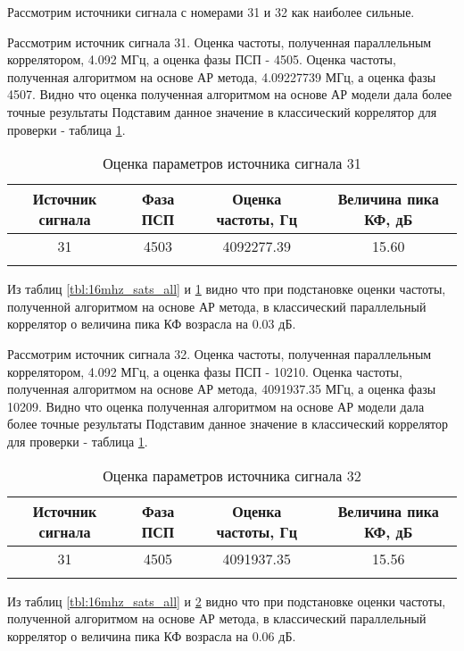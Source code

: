 Рассмотрим источники сигнала с номерами 31 и 32 как наиболее сильные.

Рассмотрим источник сигнала 31. Оценка частоты, полученная параллельным коррелятором, 4.092 МГц, а оценка фазы ПСП - 4505.
Оценка частоты, полученная алгоритмом на основе АР метода, 4.09227739 МГц, а оценка фазы 4507. Видно что оценка полученная алгоритмом на основе АР
модели дала более точные результаты Подставим данное значение в классический коррелятор для проверки - таблица \ref{tbl:16mhz_sat_31}.
\begin{center}
	\begin{longtable}{ | c | c | c | c |}
	\hline
	Источник сигнала & Фаза ПСП & Оценка частоты, Гц & Величина пика КФ, дБ \\ \hline
	31 & 4503 & 4092277.39	& 15.60 \\ \hline
	\caption{Оценка параметров источника сигнала 31}
	\label{tbl:16mhz_sat_31}
	\end{longtable}
\end{center}

Из таблиц \ref{tbl:16mhz_sats_all} и \ref{tbl:16mhz_sat_31} видно что при подстановке оценки частоты, полученной алгоритмом на основе АР метода, в
классический параллельный коррелятор о величина пика КФ возрасла на 0.03 дБ.

Рассмотрим источник сигнала 32. Оценка частоты, полученная параллельным коррелятором, 4.092 МГц, а оценка фазы ПСП - 10210.
Оценка частоты, полученная алгоритмом на основе АР метода, 4091937.35 МГц, а оценка фазы 10209. Видно что оценка полученная алгоритмом на основе АР
модели дала более точные результаты Подставим данное значение в классический коррелятор для проверки - таблица \ref{tbl:16mhz_sat_31}.
\begin{center}
	\begin{longtable}{ | c | c | c | c |}
	\hline
	Источник сигнала & Фаза ПСП & Оценка частоты, Гц & Величина пика КФ, дБ \\ \hline
	31 & 4505 & 4091937.35	& 15.56 \\ \hline
	\caption{Оценка параметров источника сигнала 32}
	\label{tbl:16mhz_sat_32}
	\end{longtable}
\end{center}

Из таблиц \ref{tbl:16mhz_sats_all} и \ref{tbl:16mhz_sat_32} видно что при подстановке оценки частоты, полученной алгоритмом на основе АР метода, в
классический параллельный коррелятор о величина пика КФ возрасла на 0.06 дБ.

